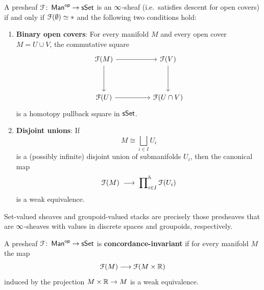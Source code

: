 \begin{theorem}\label{ch3:: thm: BBEP-sheaf-criterion}
{\cite[Theorem~5.1]{BBEP24}}
A presheaf \(\mathcal F\colon \operatorname{\sf Man}^{\mathsf{op}}\to\operatorname{\sf sSet}\) is an \(\operatorname{\infty}\)-sheaf (i.e.\ satisfies descent for open covers)
if and only if \(\mathcal F(\emptyset)\simeq *\) and the following two conditions hold:
\begin{enumerate}
  \item \label{binary cover} \textbf{Binary open covers}: For every manifold \(M\) and every open cover \(M=U\cup V\),
  the commutative square
  \begin{equation}
    \begin{tikzcd}[ampersand replacement=\&]
        {\cF(M)} \&\& {\cF(V)} \\
        \\
        {\cF(U)} \&\& {\cF(U\cap V)}
        \arrow[from=1-1, to=1-3]
        \arrow[from=1-1, to=3-1]
        \arrow[from=1-3, to=3-3]
        \arrow[from=3-1, to=3-3]
    \end{tikzcd}
  \end{equation}
  is a homotopy pullback square in \(\operatorname{\sf sSet}\).
  \item \label{disj union} \textbf{Disjoint unions}: If 
  \begin{equation}
    M \cong \bigsqcup_{i\in I} U_i
  \end{equation} is a (possibly infinite) disjoint union of
  submanifolds \(U_i\), then the canonical map
  \begin{equation}
    \mathcal F(M)\;\longrightarrow\;\prod\nolimits^{h}_{i\in I} \mathcal F(U_i)
  \end{equation}
  is a weak equivalence.
\end{enumerate}
\end{theorem}


Set-valued sheaves and groupoid-valued stacks are precisely those presheaves that are $\operatorname{\infty}$-sheaves with values in discrete spaces and groupoids, respectively.

\begin{definition}\label{ch3:: def: concordance-invariant}
  {\cite[Definition~2.4]{BBEP24}}
  A presheaf $\mathcal F\colon\operatorname{\sf Man}^{\mathsf{op}}\to\operatorname{\sf sSet}$ is \textbf{concordance-invariant} if
  for every manifold $M$ the map
  \begin{equation}
    \mathcal F(M)\longrightarrow \mathcal F(M\times\mathbb R)
  \end{equation}
  induced by the projection $M\times\mathbb R\to M$ is a weak equivalence.
\end{definition}


